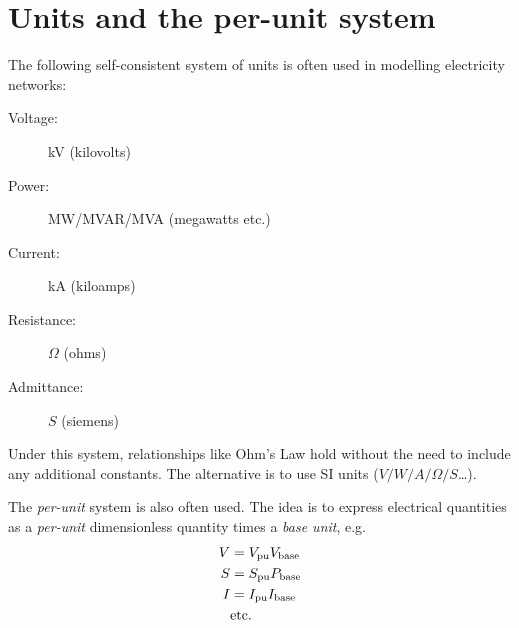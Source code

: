 \documentclass[11pt]{article}
\begin{document}
\section{Units and the per-unit system}
The following self-consistent system of units is often used in modelling electricity networks:
\begin{description}
	\item[Voltage:]kV (kilovolts)
	\item[Power:]MW/MVAR/MVA (megawatts etc.)
	\item[Current:]kA (kiloamps)
	\item[Resistance:]$\Omega$ (ohms)
	\item[Admittance:]$S$ (siemens)
\end{description}
Under this system, relationships like Ohm's Law hold without the need to include any additional constants. The alternative is to use SI units ($V/W/A/\Omega/S$\ldots).

The \emph{per-unit} system is also often used. The idea is to express electrical quantities as a \emph{per-unit} dimensionless quantity times a \emph{base unit}, e.g.
\begin{align}
V &= V_\text{pu}V_\text{base} \notag \\
S &= S_\text{pu}P_\text{base} \notag \\
I &= I_\text{pu}I_\text{base} \notag \\
&\text{etc.}
\end{align}
\end{document}
